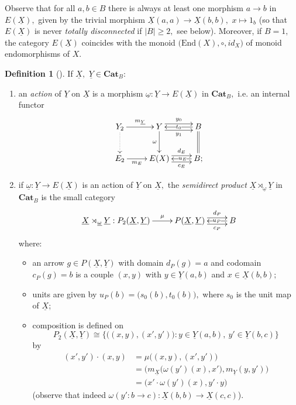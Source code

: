\documentclass[11pt]{amsart}
\theoremstyle{plain}
\theoremstyle{definition}
\newtheorem{definition}[subsubsection]{Definition}
\theoremstyle{remark}
\newcommand{\un}{\underline}
\begin{document}
Observe that for all $a,b\in B$ there is always at least one morphism $a\rightarrow b$ in $E(\un{X}),$ given by the trivial morphism $\un{X}(a,a)\rightarrow\un{X}(b,b),$ $x\mapsto 1_b$ (so that $E(\un{X})$ is never \emph{totally disconnected} if $|B|\geq 2,$ see below). Moreover, if $B=1,$ the category $E(\un{X})$ coincides with the monoid $\big(\mathrm{End}(X),\circ,id_X\big)$ of monoid endomorphisms of $X.$

\begin{definition}[\cite{a1}]
\label{def:action_Cat_B}
If $\un{X},$ $\un{Y}\in\mathbf{Cat}_B$:
\begin{enumerate}
\item an \emph{action} of $\un{Y}$ on $\un{X}$ is a morphism $\un{\omega}\colon\un{Y}\rightarrow E(\un{X})$ in $\mathbf{Cat}_B,$ i.e. an internal functor
\begin{equation*}
\xymatrix{
{Y_2} \ar@{.>}[d] \ar[r]^-{m_{\un{Y}}} &{Y} \ar[d]_-{\omega} \ar@<.9ex>[r]^-{y_0} \ar@<-.9ex>[r]_-{y_1} &B \ar@{=}[d] \ar[l]|-{t_0} \\
{E_2} \ar[r]_-{m_E} &{E(X)} \ar@<.9ex>[r]^-{d_E} \ar@<-.9ex>[r]_-{c_E} &{B;} \ar[l]|(.40){u_E}
}
\end{equation*}
\item if $\un{\omega}\colon\un{Y}\rightarrow E(\un{X})$ is an action of $\un{Y}$ on $\un{X},$ the \emph{semidirect product} $\un{X}\rtimes_{\un{\omega}}\un{Y}$ in $\mathbf{Cat}_B$ is the small category
\begin{equation*}
\xymatrix{{\un{X}\rtimes_{\un{\omega}}\un{Y}:P_2(\un{X},\un{Y})} \ar[r]^-{\mu} &{P(\un{X},\un{Y})} \ar@<.9ex>[r]^-{d_P} \ar@<-.9ex>[r]_-{c_P} &{B} \ar[l]|(.37){u_P}}
\end{equation*}
where:
\begin{itemize}
\item an arrow $g\in P(\un{X},\un{Y})$ with domain $d_P(g)=a$ and codomain $c_P(g)=b$ is a couple $(x,y)$ with $y\in\un{Y}(a,b)$ and $x\in\un{X}(b,b);$
\item units are given by $u_P(b)=\big(s_0(b),t_0(b)\big),$ where $s_0$ is the unit map of $\un{X}$;
\item composition is defined on
\begin{equation*}
P_2(\un{X},\un{Y})\cong\big\{\big((x,y),(x',y')\big):y\in\un{Y}(a,b), \ y'\in\un{Y}(b,c)\big\}
\end{equation*}
by
\begin{equation*}
\begin{split}
(x',y')\cdot(x,y)&=\mu\big((x,y),(x',y')\big)\\
&=\Big(m_{\un{X}}\big(\omega(y')(x),x'\big),m_{\un{Y}}(y,y')\Big)\\
&=\big(x'\cdot\omega(y')(x),y'\cdot y\big)
\end{split}
\end{equation*}
(observe that indeed $\omega(y'\colon b\rightarrow c)\colon\un{X}(b,b)\rightarrow\un{X}(c,c)$).
\end{itemize}
 \end{enumerate}
\end{definition}
\end{document}
